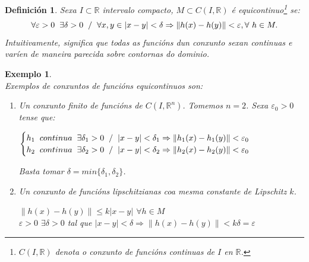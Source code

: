 \documentclass[11pt, a4paper,twoside]{article}
\newcommand{\iindex}[1]{\emph{#1}\index{#1}}
\theoremstyle{theorem-style}  %
\theoremstyle{definition-style}
\newtheorem{definition}{Definición}[section]
\theoremstyle{example-style}
\newtheorem{example}{Exemplo}[section]
\providecommand{\norm}[1]{\left\lVert#1\right\rVert} %
\begin{document}
\begin{definition}
	Sexa $I \subset \mathbb{R}$ intervalo compacto, $M \subset C(I, \mathbb{R})$ é \iindex{equicontinuo}\footnote{ $ C(I, \mathbb{R})$ denota o conxunto de funcións continuas de $ I $ en $ \mathbb{R} $.} se:
	\[\forall \varepsilon > 0 \hspace{0,2cm} \exists \delta > 0 \hspace{0,2cm} / \hspace{0,2cm} \forall x, y\in |x-y| < \delta \Rightarrow \norm{h(x) - h(y)} < \varepsilon, \forall \ h \in M.\]
	Intuitivamente, significa que todas as funcións dun conxunto sexan continuas e varíen de maneira parecida sobre contornas do dominio.
\end{definition}
\begin{example} \ \\
	Exemplos de conxuntos de funcións equicontinuos son:
	\begin{enumerate}
		\item Un conxunto finito de funcións de $C(I, \mathbb{R}^n)$. Tomemos $n = 2$. Sexa $\varepsilon_0 > 0$ tense que:
		\begin{center}
			$\begin{cases}
			h_1 \hspace{0,2cm} continua \hspace{0,2cm} \exists \delta_1 > 0 \hspace{0,2cm} / \hspace{0,2cm} |x-y|<\delta_1 \Rightarrow \norm{h_1(x) - h_1(y)} < \varepsilon_0 \\
			h_2 \hspace{0,2cm} continua \hspace{0,2cm} \exists \delta_2 > 0 \hspace{0,2cm} / \hspace{0,2cm} |x-y|<\delta_2 \Rightarrow \norm{h_2(x) - h_2(y)} < \varepsilon_0
			\end{cases}$
		\end{center}
		Basta tomar $\delta = min\{\delta_1, \delta_2\}$.
		\item Un conxunto de funcións lipschitzianas coa mesma constante de Lipschitz $k$.
		\begin{center}
			$\norm{h(x) - h(y)}\leq k|x-y|$ $\forall h \in M$ \\
			$\varepsilon > 0$ $\exists \delta > 0$ tal que $|x-y|<\delta \Rightarrow \norm{h(x) - h(y)} < k\delta = \varepsilon$
		\end{center}
	\end{enumerate}
\end{example}
\end{document}

